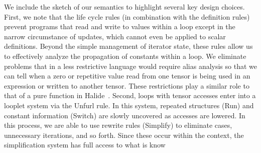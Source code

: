 We include the sketch of our semantics to highlight several key design choices.
%
First, we note that the life cycle rules (in combination with the definition rules) prevent programs that read and write to values within a loop except in the narrow circumstance of updates, which cannot even be applied to scalar definitions.
%
Beyond the simple management of iterator state, these rules allow us to effectively analyze the propagation of constants within a loop.
%
We eliminate problems that in a less restrictive language would require alias analysis so that we can tell when a zero or repetitive value read from one tensor is being used in an expression or written to another tensor.
%
These restrictions play a similar role to that of a pure function in Halide~\cite{ragan-kelley_halide_2013}.
%
Second, loops with tensor accesses enter into a looplet system via the Unfurl rule.
%
In this system, repeated structures (Run) and constant information (Switch)  are slowly uncovered as accesses are lowered.
%
In this process, we are able to use rewrite rules (Simplify) to eliminate cases, unnecessary iterations, and so forth.
%
Since these occur within the context, the simplification system has full access to what is know




